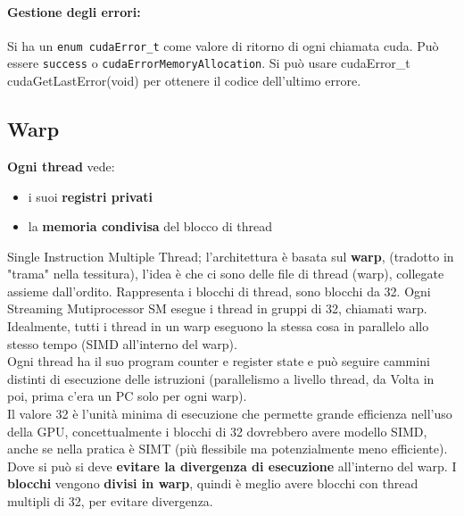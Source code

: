 \paragraph{Gestione degli errori:} Si ha un \texttt{enum cudaError\_t} come valore di ritorno di ogni chiamata cuda. Può essere \texttt{success} o \texttt{cudaErrorMemoryAllocation}. Si può usare {cudaError\_t cudaGetLastError(void)} per ottenere il codice dell'ultimo errore.\\




\newpage

\subsection{Warp}

\textbf{Ogni thread} vede: 
\begin{itemize}
	\item i suoi \textbf{registri privati}
	\item la \textbf{memoria condivisa} del blocco di thread
\end{itemize}

Single Instruction Multiple Thread; l'architettura è basata sul \textbf{warp}, (tradotto in "trama" nella tessitura), l'idea è che ci sono delle file di thread (warp), collegate assieme dall'ordito. Rappresenta i blocchi di thread, sono blocchi da 32. Ogni Streaming Mutiprocessor SM esegue i thread in gruppi di 32, chiamati warp. Idealmente, tutti i thread in un warp eseguono la stessa cosa in parallelo allo stesso tempo (SIMD all'interno del warp).\\

Ogni thread ha il suo program counter e register state e può seguire cammini distinti di esecuzione delle istruzioni (parallelismo a livello thread, da Volta in poi, prima c'era un PC solo per ogni warp).\\

Il valore 32 è l'unità minima di esecuzione che permette grande efficienza nell'uso della GPU, concettualmente i blocchi di 32 dovrebbero avere modello SIMD, anche se nella pratica è SIMT (più flessibile ma potenzialmente meno efficiente). Dove si può si deve \textbf{evitare la divergenza di esecuzione} all'interno del warp. I \textbf{blocchi} vengono \textbf{divisi in warp}, quindi è meglio avere blocchi con thread multipli di 32, per evitare divergenza.\\

